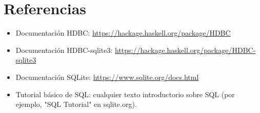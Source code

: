 \documentclass[12pt]{article}
\begin{document}
\section*{Referencias}
\begin{itemize}
  \item Documentaci\'on HDBC: \url{https://hackage.haskell.org/package/HDBC}
  \item Documentaci\'on HDBC-sqlite3: \url{https://hackage.haskell.org/package/HDBC-sqlite3}
  \item Documentaci\'on SQLite: \url{https://www.sqlite.org/docs.html}
  \item Tutorial b\'asico de SQL: cualquier texto introductorio sobre SQL (por ejemplo, "SQL Tutorial" en sqlite.org).
\end{itemize}
\end{document}
